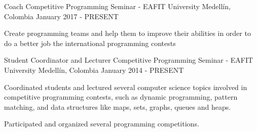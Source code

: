 \begin{cventries}
  \cventry
    {Coach}
    {Competitive Programming Seminar - EAFIT University}
    {Medellín, Colombia}
    {January 2017 - PRESENT}
    {
      \begin{cvitems}
        \item {Create programming teams and help them to improve their abilities in order to do a better job the international programming contests}
      \end{cvitems}
    }
  \cventry
    {Student Coordinator and Lecturer}
    {Competitive Programming Seminar - EAFIT University}
    {Medellín, Colombia}
    {January 2014 - PRESENT}
    {
      \begin{cvitems}
        \item {Coordinated students and lectured several computer science topics involved in competitive programming contests, such as dynamic programming, pattern matching, and data structures like maps, sets, graphs, queues and heaps.}
        \item {Participated and organized several programming competitions.}
      \end{cvitems}
    }
\end{cventries}
